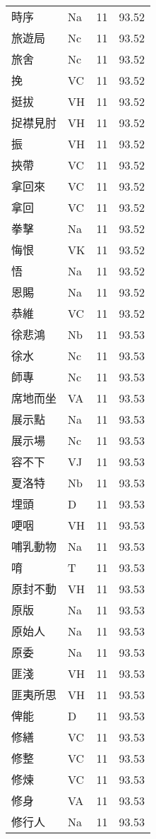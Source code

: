 \documentclass[twocolumn]{book}
\begin{document}
\begin{supertabular}{llrr}
時序 & Na & 11 &  93.52\\
旅遊局 & Nc & 11 &  93.52\\
旅舍 & Nc & 11 &  93.52\\
挽 & VC & 11 &  93.52\\
挺拔 & VH & 11 &  93.52\\
捉襟見肘 & VH & 11 &  93.52\\
振 & VH & 11 &  93.52\\
挾帶 & VC & 11 &  93.52\\
拿回來 & VC & 11 &  93.52\\
拿回 & VC & 11 &  93.52\\
拳擊 & Na & 11 &  93.52\\
悔恨 & VK & 11 &  93.52\\
悟 & Na & 11 &  93.52\\
恩賜 & Na & 11 &  93.52\\
恭維 & VC & 11 &  93.52\\
徐悲鴻 & Nb & 11 &  93.53\\
徐水 & Nc & 11 &  93.53\\
師專 & Nc & 11 &  93.53\\
席地而坐 & VA & 11 &  93.53\\
展示點 & Na & 11 &  93.53\\
展示場 & Nc & 11 &  93.53\\
容不下 & VJ & 11 &  93.53\\
夏洛特 & Nb & 11 &  93.53\\
埋頭 & D & 11 &  93.53\\
哽咽 & VH & 11 &  93.53\\
哺乳動物 & Na & 11 &  93.53\\
唷 & T & 11 &  93.53\\
原封不動 & VH & 11 &  93.53\\
原版 & Na & 11 &  93.53\\
原始人 & Na & 11 &  93.53\\
原委 & Na & 11 &  93.53\\
匪淺 & VH & 11 &  93.53\\
匪夷所思 & VH & 11 &  93.53\\
俾能 & D & 11 &  93.53\\
修繕 & VC & 11 &  93.53\\
修整 & VC & 11 &  93.53\\
修煉 & VC & 11 &  93.53\\
修身 & VA & 11 &  93.53\\
修行人 & Na & 11 &  93.53\\

\end{supertabular}
\end{document}
